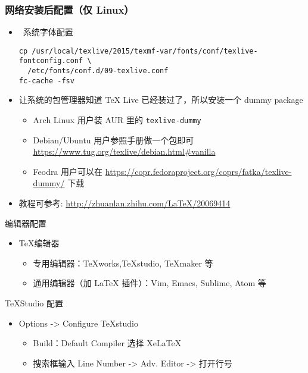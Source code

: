 \begin{frame}[fragile]
  \frametitle{网络安装后配置（仅 Linux）}
  \begin{itemize}
  \item
    \XeTeX\ 系统字体配置
    \begin{verbatim}
cp /usr/local/texlive/2015/texmf-var/fonts/conf/texlive-fontconfig.conf \
  /etc/fonts/conf.d/09-texlive.conf
fc-cache -fsv
    \end{verbatim}
  \item 让系统的包管理器知道 TeX Live 已经装过了，所以安装一个 dummy package
    \begin{itemize}
      \item Arch Linux 用户装 AUR 里的 \verb|texlive-dummy|
      \item Debian/Ubuntu 用户参照手册做一个包即可 
        \url{https://www.tug.org/texlive/debian.html\#vanilla}
      \item Feodra 用户可以在
        \url{https://copr.fedoraproject.org/coprs/fatka/texlive-dummy/} 下载
    \end{itemize}
  \item 教程可参考: \url{http://zhuanlan.zhihu.com/LaTeX/20069414}
  \end{itemize}
\end{frame}

\begin{frame}{编辑器配置}
  \begin{itemize}
    \item \TeX{}编辑器
      \begin{itemize}
        \item 专用编辑器：TeXworks,\alert{TeXstudio}, TeXmaker 等
        \item 通用编辑器（加 LaTeX 插件）：Vim, Emacs, Sublime, Atom 等
      \end{itemize}
  \end{itemize}
  \begin{exampleblock}{TeXStudio 配置}
    \begin{itemize}
      \item Options -> Configure TeXstudio
        \begin{itemize}
          \item Build：Default Compiler 选择 XeLaTeX
          \item 搜索框输入 Line Number -> Adv. Editor -> 打开行号
      \end{itemize}
  \end{itemize}
\end{exampleblock}
\end{frame}

